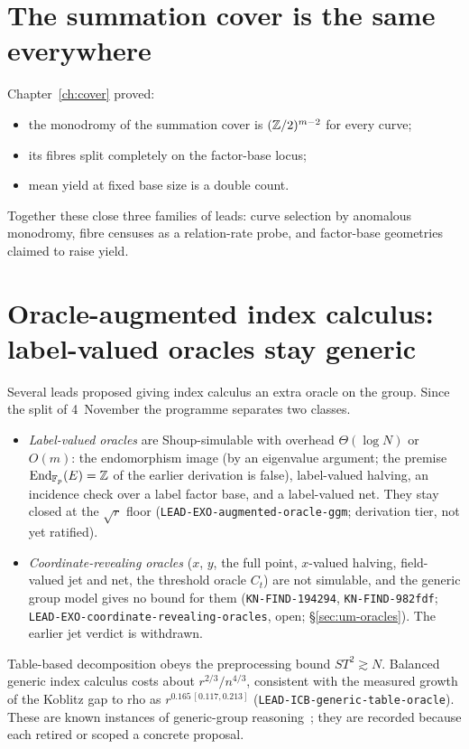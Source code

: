 \section{The summation cover is the same everywhere}

Chapter~\ref{ch:cover} proved:
\begin{itemize}
\item the monodromy of the summation cover is $(\mathbb{Z}/2)^{m-2}$ for every
  curve;
\item its fibres split completely on the factor-base locus;
\item mean yield at fixed base size is a double count.
\end{itemize}
Together these close three families of leads: curve selection by
anomalous monodromy, fibre censuses as a relation-rate probe, and
factor-base geometries claimed to raise yield.

\section{Oracle-augmented index calculus: label-valued oracles stay generic}

Several leads proposed giving index calculus an extra oracle on the group.
Since the split of 4~November the programme separates two classes.
\begin{itemize}
\item \emph{Label-valued oracles} are Shoup-simulable with overhead
  $\Theta(\log N)$ or $O(m)$: the endomorphism image (by an eigenvalue
  argument; the premise $\operatorname{End}_{\mathbb{F}_p}(E)=\mathbb{Z}$ of the earlier
  derivation is false), label-valued halving, an incidence check over a
  label factor base, and a label-valued net. They stay closed at the
  $\sqrt r$ floor (\texttt{LEAD-EXO-augmented-oracle-ggm}; derivation
  tier, not yet ratified).
\item \emph{Coordinate-revealing oracles} ($x$, $y$, the full point,
  $x$-valued halving, field-valued jet and net, the threshold oracle
  $C_t$) are not simulable, and the generic group model gives no bound for
  them (\texttt{KN-FIND-194294}, \texttt{KN-FIND-982fdf};
  \texttt{LEAD-EXO-coordinate-revealing-oracles}, open;
  \S\ref{sec:um-oracles}). The earlier jet verdict is withdrawn.
\end{itemize}

Table-based decomposition obeys the
preprocessing bound $ST^2\gtrsim N$. Balanced generic index calculus costs
about $r^{2/3}/n^{4/3}$, consistent with the measured growth of the Koblitz
gap to rho as $r^{0.165\,[0.117,0.213]}$
(\texttt{LEAD-ICB-generic-table-oracle}). These are known instances of
generic-group reasoning~\cite{cgk2018}; they are recorded because each
retired or scoped a concrete proposal.

